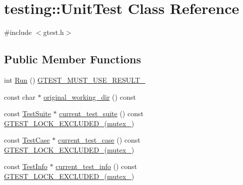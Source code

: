 \hypertarget{classtesting_1_1_unit_test}{}\section{testing\+::Unit\+Test Class Reference}
\label{classtesting_1_1_unit_test}


{\ttfamily \#include $<$gtest.\+h$>$}

\subsection*{Public Member Functions}
\begin{DoxyCompactItemize}
\item 
int \mbox{\hyperlink{classtesting_1_1_unit_test_a2febc800536b44500565f4c423f359d3}{Run}} () \mbox{\hyperlink{_obj__test_2lib_2googletest-release-1_88_81_2googletest_2include_2gtest_2internal_2gtest-port_8h_a8e5aab8276b2645f64f41c9e3021b935}{G\+T\+E\+S\+T\+\_\+\+M\+U\+S\+T\+\_\+\+U\+S\+E\+\_\+\+R\+E\+S\+U\+L\+T\+\_\+}}
\item 
const char $\ast$ \mbox{\hyperlink{classtesting_1_1_unit_test_af6809b7747785c80f7a2f31f6b39b152}{original\+\_\+working\+\_\+dir}} () const
\item 
const \mbox{\hyperlink{classtesting_1_1_test_suite}{Test\+Suite}} $\ast$ \mbox{\hyperlink{classtesting_1_1_unit_test_aafbaafe78ecb5c3dd76849385b04d35e}{current\+\_\+test\+\_\+suite}} () const \mbox{\hyperlink{_obj__test_2lib_2googletest-release-1_88_81_2googletest_2include_2gtest_2internal_2gtest-port_8h_a69abff5a4efdd07bd5faebe3dd318d06}{G\+T\+E\+S\+T\+\_\+\+L\+O\+C\+K\+\_\+\+E\+X\+C\+L\+U\+D\+E\+D\+\_\+}}(\mbox{\hyperlink{classtesting_1_1_unit_test_abb94ef45cf0ab43be81ac6d5b1364132}{mutex\+\_\+}})
\item 
const \mbox{\hyperlink{classtesting_1_1_test_case}{Test\+Case}} $\ast$ \mbox{\hyperlink{classtesting_1_1_unit_test_a2bf61896036ae03edbd7bceed14f9e18}{current\+\_\+test\+\_\+case}} () const \mbox{\hyperlink{_obj__test_2lib_2googletest-release-1_88_81_2googletest_2include_2gtest_2internal_2gtest-port_8h_a69abff5a4efdd07bd5faebe3dd318d06}{G\+T\+E\+S\+T\+\_\+\+L\+O\+C\+K\+\_\+\+E\+X\+C\+L\+U\+D\+E\+D\+\_\+}}(\mbox{\hyperlink{classtesting_1_1_unit_test_abb94ef45cf0ab43be81ac6d5b1364132}{mutex\+\_\+}})
\item 
const \mbox{\hyperlink{classtesting_1_1_test_info}{Test\+Info}} $\ast$ \mbox{\hyperlink{classtesting_1_1_unit_test_a088eaf814a33085ace3d881d22e6bdea}{current\+\_\+test\+\_\+info}} () const \mbox{\hyperlink{_obj__test_2lib_2googletest-release-1_88_81_2googletest_2include_2gtest_2internal_2gtest-port_8h_a69abff5a4efdd07bd5faebe3dd318d06}{G\+T\+E\+S\+T\+\_\+\+L\+O\+C\+K\+\_\+\+E\+X\+C\+L\+U\+D\+E\+D\+\_\+}}(\mbox{\hyperlink{classtesting_1_1_unit_test_abb94ef45cf0ab43be81ac6d5b1364132}{mutex\+\_\+}})

\end{DoxyCompactItemize}
